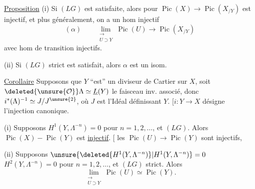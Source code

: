 
\uline{Proposition} (i) Si $(LG)$ est satisfaite, alors pour
$\operatorname{Pic}(X)\longrightarrow\operatorname{Pic}(X_{/Y})$
est injectif, et plus généralement, on a un hom injectif
\[
(\alpha)\qquad
\mathop{\mathrm{lim}}_{\substack{\longrightarrow\\U\supset Y}}
\operatorname{Pic}(U)\longrightarrow\operatorname{Pic}(X_{/Y})
\]
avec hom de transition injectifs.

(ii) Si $(LG)$ strict est satisfait, alors $\alpha$ est un isom.

\uline{Corollaire} Supposons que $Y$ ``est'' un diviseur de
Cartier sur $X$, soit $\deleted{\unsure{\mathcal O}}\Lambda\simeq
\underline L(Y)$ le faisceau inv. associé, donc
$i^*(\Lambda)^{-1}\simeq J/J^{\unsure{2}}$,
où $J$ est l'Idéal définissant $Y$.
[$i:Y\longrightarrow X$ désigne l'injection canonique.


(i) Supposons $H^1(Y,\Lambda^{-n})=0$ pour $n=1,2,\ldots$,
et $(LG)$. Alors $\operatorname{Pic}(X)\mathbin{-}\operatorname{Pic}(Y)$
est \uline{injectif}.
[ 
les $\operatorname{Pic}(U)\longrightarrow\operatorname{Pic}(Y)$
sont injectifs,  

(ii) Supposons
$\unsure{\deleted{H^1(Y,\Lambda^{-n})}|H^1(Y,\Lambda^{-n})}=0$
 $H^2(Y,\Lambda^{-n})=0$ pour $n=1,2,\ldots$,
et $(LG)$ strict.
Alors
\[
\mathop{\mathrm{lim}}_{\substack{\longrightarrow\\U\supset Y}}
\operatorname{Pic}(U)\simeq\operatorname{Pic}(Y).
\]


